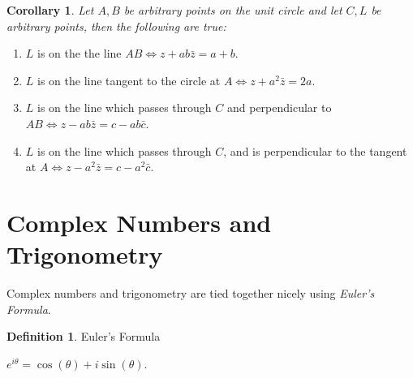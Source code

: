 \documentclass[10pt]{article}
\theoremstyle{definition}
\newtheorem*{defn}{Definition}
\theoremstyle{plain}
\newtheorem*{cor}{Corollary}
\theoremstyle{remark}
\newcommand{\conjugate}[1]{\bar{#1}}
\begin{document}
\bigskip

\begin{cor}
Let $A, B$ be arbitrary points on the unit circle and let $C, L$ be arbitrary points, then the following are true:
\end{cor}

\begin{enumerate}
    \item $L$ is on the the line $AB \Leftrightarrow z + ab\conjugate{z} = a+b$.
    \item $L$ is on the line tangent to the circle at $A \Leftrightarrow z + a^{2}\conjugate{z} = 2a$.
    \item $L$ is on the line which passes through $C$ and perpendicular to $AB \Leftrightarrow z - ab\conjugate{z} = c - ab\conjugate{c}$.
    \item $L$ is on the line which passes through $C$, and is perpendicular to the tangent at $A \Leftrightarrow z - a^{2}\conjugate{z} = c - a^{2}\conjugate{c}$. 
\end{enumerate}

\section*{Complex Numbers and Trigonometry}

Complex numbers and trigonometry are tied together nicely using \emph{Euler's Formula}. 

\medskip

\begin{defn}{Euler's Formula}

$e^{i\theta} = \cos{(\theta)} + i\sin{(\theta)}$.
\end{defn}

\bigskip
\end{document}

